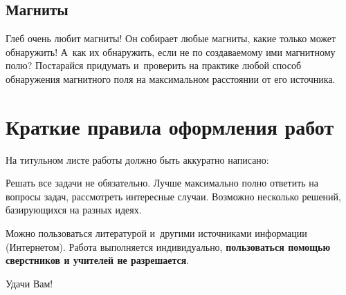 \documentclass[a4paper,12pt]{article}
\begin{document}
\subsection{Магниты}
Глеб очень любит магниты! Он собирает любые магниты, какие только может обнаружить!
А~как их обнаружить, если не по создаваемому ими магнитному полю? Постарайся придумать
и~проверить на практике любой способ обнаружения магнитного поля
на максимальном расстоянии от его источника.

\newpage

\section*{Краткие правила оформления работ}

\footnotesize

На титульном листе работы должно быть аккуратно написано:

Решать все задачи не обязательно. Лучше максимально полно ответить на вопросы задач,
рассмотреть интересные случаи. Возможно несколько решений, базирующихся
на разных идеях.

Можно пользоваться литературой и~другими источниками информации (Интернетом).
Работа выполняется индивидуально, \textbf{пользоваться помощью сверстников и учителей не разрешается}.



\bigskip
\normalsize

Удачи Вам!
\end{document}
